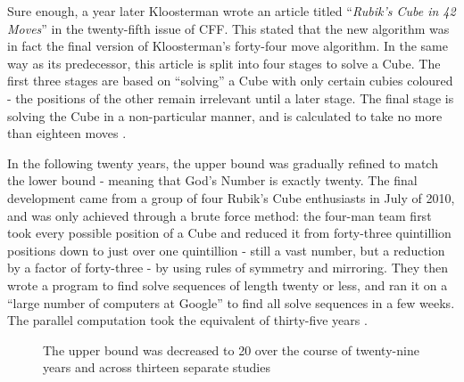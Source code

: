 \documentclass{report}
\newcommand{\propernoun}[1]{\enquote{\textit{#1}}}
\begin{document}
    Sure enough, a year later Kloosterman wrote an article titled \propernoun{Rubik's Cube in 42 Moves} in the twenty-fifth issue of CFF. This stated that the new algorithm was in fact the final version of Kloosterman's forty-four move algorithm. In the same way as its predecessor, this article is split into four stages to solve a Cube. The first three stages are based on \enquote{solving} a Cube with only certain cubies coloured - the positions of the other remain irrelevant until a later stage. The final stage is solving the Cube in a non-particular manner, and is calculated to take no more than eighteen moves \cite{Kloosterman1990}.
    
    In the following twenty years, the upper bound was gradually refined to match the lower bound - meaning that God's Number is exactly twenty. The final development came from a group of four Rubik's Cube enthusiasts in July of 2010, and was only achieved through a brute force method: the four-man team first took every possible position of a Cube and reduced it from forty-three quintillion positions down to just over one quintillion - still a vast number, but a reduction by a factor of forty-three - by using rules of symmetry and mirroring. They then wrote a program to find solve sequences of length twenty or less, and ran it on a \enquote{large number of computers at Google} to find all solve sequences in a few weeks. The parallel computation took the equivalent of thirty-five years \cite{Rokicki2010}.
    
   	\begin{figure}[h]
    	\begin{center}
    		\caption{The upper bound was decreased to 20 over the course of twenty-nine years and across thirteen separate studies \cite{Rokicki2010}}
			\label{fig:godsnumbergraph}
		\end{center}
	\end{figure}
\end{document}
